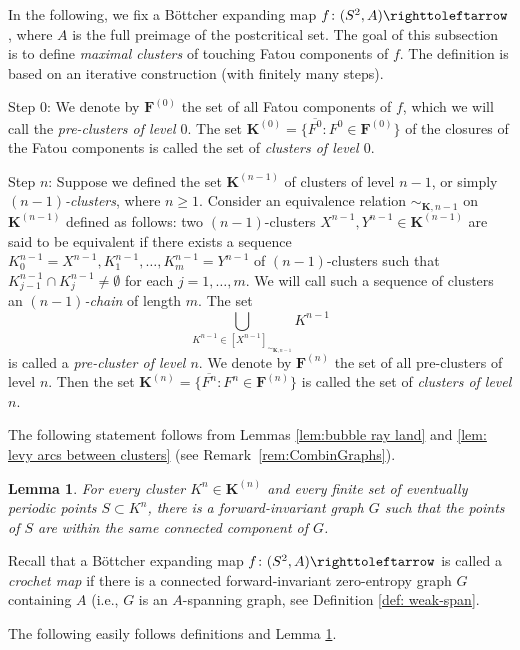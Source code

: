 \documentclass{amsart}
\theoremstyle{plain}
\newtheorem{lemma}[theorem]{Lemma}
\theoremstyle{definition}
\theoremstyle{remark}
\newcommand\selfmap{\righttoleftarrow}
\begin{document}
In the following, we fix a B\"ottcher expanding map $f\colon (S^2,A)\selfmap$,  where $A$ is the full preimage of the postcritical set.  The goal of this subsection is to define \emph{maximal clusters} of touching Fatou components of $f$.  The definition is based on an iterative construction (with finitely many steps). 

Step $0$:  We denote by $\mathbf{F}^{(0)}$ the set of all Fatou components of $f$, which we will call the \emph{pre-clusters of level $0$}. The set $\mathbf{K}^{(0)}= \{\overline{F^0}\colon F^0 \in \mathbf{F}^{(0)}\}$ of the closures of the Fatou components is called the set of \emph{clusters of level $0$}.

Step $n$: Suppose we defined the set $\mathbf{K}^{(n-1)}$ of clusters of level $n-1$,  or simply \emph{$(n-1)$-clusters}, where $n\geq 1$.  Consider an equivalence relation $\sim_{\mathbf{K}, n-1}$ on $\mathbf{K}^{(n-1)}$ defined as follows:
two $(n-1)$-clusters $X^{n-1},Y^{n-1} \in \mathbf{K}^{(n-1)}$ are said to be equivalent if there exists a sequence $K_0^{n-1} = X^{n-1}, K_1^{n-1}, \dots, K_m^{n-1}=Y^{n-1}$ of $(n-1)$-clusters such that $K_{j-1}^{n-1}\cap K_j^{n-1}\neq \emptyset$ for each $j=1,\dots, m$. We will call such a sequence of clusters an \emph{$(n-1)$-chain} of length $m$. 
The set $$\bigcup_{K^{n-1} \in [X^{n-1}]_{\sim_{\mathbf{K}, n-1}}} K^{n-1}$$ 
is called a \emph{pre-cluster of level $n$}.   We denote by $\mathbf{F}^{(n)}$ the set of all pre-clusters of level $n$.  Then the set $\mathbf{K}^{(n)}= \{\overline{F^{n}}\colon F^n \in \mathbf{F}^{(n)}\}$ is called the set of \emph{clusters of level $n$}. 

The following statement follows from Lemmas \ref{lem:bubble ray land} and  \ref{lem: levy arcs between clusters} (see Remark~\ref{rem:CombinGraphs}).

\begin{lemma}
\label{lem:graphs in clusters}
For every cluster $K^n\in \mathbf{K}^{(n)}$ and every finite set of eventually periodic points $S \subset K^n$, there is a forward-invariant graph $G$ such that the points of $S$ are within the same connected component of $G$.
\end{lemma}


Recall that a B\"{o}ttcher expanding map $f\colon (S^2,A) \selfmap$ is called a \emph{crochet map} if there is a connected forward-invariant zero-entropy graph $G$ containing $A$ (i.e., $G$ is an $A$-spanning graph, see Definition \ref{def: weak-span}. 

The following easily follows definitions and Lemma \ref{lem:graphs in clusters}.
\end{document}
